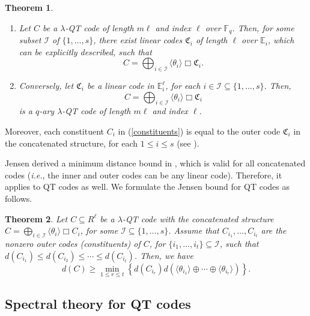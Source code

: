 \documentclass[11pt]{amsart}
\theoremstyle{plain}
\newtheorem{thm}{Theorem}[section]
\theoremstyle{definition}
\numberwithin{equation}{section}
\newcommand{\Fq}{\mathbb{F}_{q}}
\newcommand{\E}{\mathbb{E}}
\begin{document}
\begin{thm} \cite[Theorem 2]{LG} \label{Jensen's thm}\hfill
\begin{enumerate}
\item[i.] Let $C$ be a $\lambda$-QT code of length $m\ell$ and index $\ell$ over $\Fq$. Then, for some subset $\mathcal{I}$ of $\{1,\ldots ,s\}$, there exist linear codes $\mathfrak{C}_i$ of length $\ell$ over $\E_i$, which can be explicitly described, such that $$C=\displaystyle\bigoplus_{i\in \mathcal{I}} \langle \theta_i \rangle \Box \mathfrak{C}_i.$$
\item[ii.] Conversely, let $\mathfrak{C}_i$ be a linear code in $\E_i^\ell$, for each $i\in \mathcal{I} \subseteq \{1,\ldots ,s\}$. Then, $$C=\displaystyle\bigoplus_{i\in \mathcal{I}} \langle \theta_i \rangle \Box \mathfrak{C}_i$$ is a $q$-ary $\lambda$-QT code of length $m\ell$ and index $\ell$.
\end{enumerate}
\end{thm}

Moreover, each constituent $C_i$ in (\ref{constituents}) is equal to the outer code $\mathfrak{C}_i$ in the concatenated structure, for each $1\leq i \leq s$ (see \cite[Theorem 3]{LG}).

Jensen derived a minimum distance bound in \cite[Theorem 4]{J}, which is valid for all concatenated codes ({\it i.e.}, the inner and outer codes can be any linear code). Therefore, it applies to QT codes as well. We formulate the Jensen bound for QT codes as follows.
\begin{thm}  \label{Jensen bound}
Let $C\subseteq R^\ell$ be a $\lambda$-QT code with the concatenated structure $C=\bigoplus_{i\in \mathcal{I}} \langle \theta_i \rangle \Box C_i$, for some $\mathcal{I}\subseteq\{1,\ldots ,s\}$. Assume that $C_{i_1}, \ldots, C_{i_t}$ are the nonzero outer codes (constituents) of $C$, for $\{i_1,\ldots,i_t\} \subseteq \mathcal{I}$, such that $d(C_{i_1}) \leq d(C_{i_2})\leq \cdots \leq d(C_{i_t})$. Then, we have
\begin{equation}\label{Jensen}
d(C) \geq \displaystyle \min_{1\leq r \leq t} \left\{ d(C_{i_r}) d(\langle\theta_{i_1}\rangle \oplus \cdots \oplus \langle\theta_{i_r}\rangle) \right\}.
\end{equation}
\end{thm}
\vspace{7pt}

\subsection{Spectral theory for QT codes}    \label{spec sect} \hfill
\end{document}
